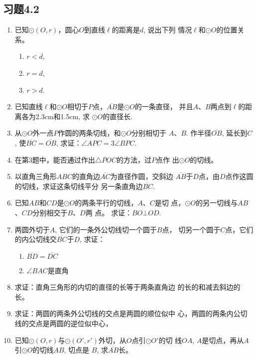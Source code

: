 \subsection*{习题4.2}
\begin{enumerate}
    \item 已知$\odot(O,r)$，圆心$O$到直线$\ell$的距离是$d$, 说出下列
    情况$\ell$和$\odot O$的位置关系。
\begin{multicols}{3}
    \begin{enumerate}
        \item $r<d$,
        \item $r=d$,
        \item $r>d$.
    \end{enumerate}
\end{multicols}

    \item 已知直线$\ell$和$\odot O$相切于$P$点，$\overline{AB}$是$\odot O$的一条直径，
    并且$A$、$B$两点到$\ell$的距离各为2.3cm和1.5cm, 求
    $\odot O$的直径长.
    \item 从$\odot O$外一点$P$作圆的两条切线，和$\odot O$分别相切于
$A$、$B$. 作半径$\overline{OB}$, 延长到$C$, 使$\overline{BC}=\overline{OB}$, 
求证：$\angle APC=3\angle BPC$.
\item 在第3题中，能否通过作出$\triangle POC$的方法，过$P$点作
出$\odot O$的切线。
\item 以直角三角形$ABC$的直角边$\overline{AC}$为直径作圆，交斜边
$\overline{AB}$于$D$点，由$D$点作这圆的切线，求证这条切线平分
另一条直角边$\overline{BC}$.
\item 已知$AB$和$CD$是$\odot O$的两条平行的切线，$A$、$C$是切
点，$\odot O$的另一切线与$AB$、$CD$分别相交于$B$、$D$两
点。
求证：$BO\bot OD$.
\item 两圆外切于$A$, 它们的一条外公切线切一个圆于$B$点，
切另一个圆于$C$点，它们的内公切线交$\overline{BC}$于$D$, 求证：
\begin{multicols}{2}
    \begin{enumerate}
        \item $\overline{BD}=\overline{DC}$
        \item $\angle BAC$是直角
    \end{enumerate}
\end{multicols}

\item 求证：直角三角形的内切的直径的长等于两条直角边
的长的和减去斜边的长。
\item 求证：两圆的两条外公切线的交点是两圆的顺位似中
心，两圆的两条内公切线的交点是两圆的逆位似中心，
\item 已知$\odot (O,r)$与$\odot (O',r')$外切，从$O$点引$\odot O'$的切
线$OA$, $A$是切点，再从$A$引$\odot O$的切线$AB$, 切点是
$B$, 求$\overline{AB}$长。
\end{enumerate}

